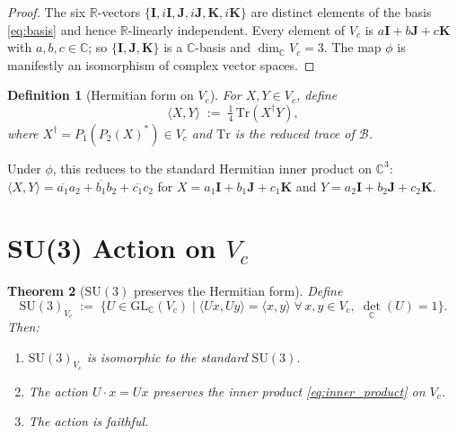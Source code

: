 \documentclass[12pt,a4paper]{article}
\newtheorem{theorem}{Theorem}[section]
\newtheorem{definition}[theorem]{Definition}
\theoremstyle{remark}
\newcommand{\B}{\mathcal{B}}          %
\newcommand{\C}{\mathbb{C}}
\newcommand{\R}{\mathbb{R}}
\begin{document}
\begin{proof}
  The six $\R$-vectors $\{\mathbf{I},i\mathbf{I},\mathbf{J},i\mathbf{J},
  \mathbf{K},i\mathbf{K}\}$ are distinct elements of the basis
  \eqref{eq:basis} and hence $\R$-linearly independent.  Every element of
  $V_c$ is $a\mathbf{I}+b\mathbf{J}+c\mathbf{K}$ with $a,b,c\in\C$;
  so $\{\mathbf{I},\mathbf{J},\mathbf{K}\}$ is a $\C$-basis and
  $\dim_\C V_c = 3$.  The map $\phi$ is manifestly an isomorphism of
  complex vector spaces.
\end{proof}

\begin{definition}[Hermitian form on $V_c$]
  \label{def:inner_product}
  \label{def:inv:Vc}
  For $X,Y\in V_c$, define
  \begin{equation}
    \label{eq:inner_product}
    \langle X,Y\rangle \;:=\;
    \tfrac{1}{4}\,\mathrm{Tr}(X^\dagger Y),
  \end{equation}
  where $X^\dagger = P_1(P_2(X)^*)\in V_c$ and $\mathrm{Tr}$ is the reduced
  trace of $\B$.
\end{definition}

Under $\phi$, this reduces to the standard Hermitian inner product on $\C^3$:
$\langle X,Y\rangle = \overline{a_1}a_2+\overline{b_1}b_2+\overline{c_1}c_2$
for $X=a_1\mathbf{I}+b_1\mathbf{J}+c_1\mathbf{K}$ and
$Y=a_2\mathbf{I}+b_2\mathbf{J}+c_2\mathbf{K}$.

\section{SU(3) Action on $V_c$}
\label{sec:su3}

\begin{theorem}[$\mathrm{SU}(3)$ preserves the Hermitian form]
  \label{thm:su3_action}
  Define
  \begin{equation}
    \label{eq:SU3_Vc}
    \mathrm{SU}(3)_{V_c} \;:=\;
    \bigl\{U\in\mathrm{GL}_\C(V_c) \;\big|\;
    \langle Ux,Uy\rangle = \langle x,y\rangle\;\forall\,x,y\in V_c,\;
    \det_\C(U)=1\bigr\}.
  \end{equation}
  Then:
  \begin{enumerate}
    \item[(a)] $\mathrm{SU}(3)_{V_c}$ is isomorphic to the standard
      $\mathrm{SU}(3)$.
    \item[(b)] The action $U\cdot x = Ux$ preserves the inner product
      \eqref{eq:inner_product} on $V_c$.
    \item[(c)] The action is faithful.
  \end{enumerate}
\end{theorem}
\end{document}
